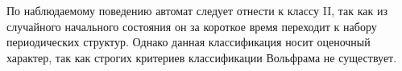 


 \par

По наблюдаемому поведению автомат следует отнести к классу II, так как из случайного начального состояния он за короткое время переходит к набору периодических структур. Однако данная классификация носит оценочный характер, так как строгих критериев классификации Вольфрама не существует.

\newpage
